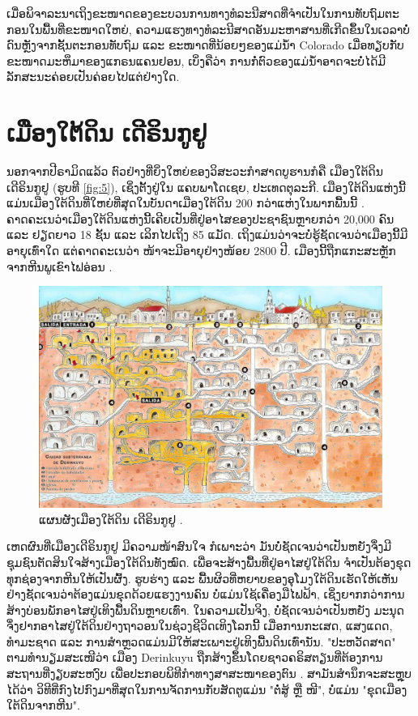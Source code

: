 \documentclass[10pt,twocolumn,letterpaper]{article}
\begin{document}
ເມື່ອພິຈາລະນາເຖິງຂະໜາດຂອງຂະບວນການທາງທໍລະນີສາດທີ່ຈຳເປັນໃນການທັບຖົມຕະກອນໃນພື້ນທີ່ຂະໜາດໃຫຍ່, ຄວາມແຮງທາງທໍລະນີສາດອັນມະຫາສານທີ່ເກີດຂຶ້ນໃນເວລາບໍ່ດົນຫຼັງຈາກຊັ້ນຕະກອນທັບຖົມ ແລະ ຂະໜາດທີ່ນ້ອຍໆຂອງແມ່ນ້ຳ Colorado ເມື່ອທຽບກັບຂະໜາດມະຫຶມາຂອງແກຣນແຄນຢອນ, ເບິ່ງຄືວ່າ ການກໍ່ຕົວຂອງແມ່ນ້ຳອາດຈະບໍ່ໄດ້ມີລັກສະນະຄ່ອຍເປັນຄ່ອຍໄປແຕ່ຢ່າງໃດ. 

\section{ເມືອງໃຕ້ດິນ ເດີຣິນກູຢູ}

ນອກຈາກປີຣາມິດແລ້ວ ຕົວຢ່າງທີ່ຍິ່ງໃຫຍ່ຂອງວິສະວະກຳສາດບູຮານກໍຄື ເມືອງໃຕ້ດິນ ເດີຣິນກູຢູ (ຮູບທີ \ref{fig:5}), ເຊິ່ງຕັ້ງຢູ່ໃນ ແຄບພາໂດເຊຍ, ປະເທດຕຸລະກີ. ເມືອງໃຕ້ດິນແຫ່ງນີ້ແມ່ນເມືອງໃຕ້ດິນທີ່ໃຫຍ່ທີ່ສຸດໃນບັນດາເມືອງໃຕ້ດິນ 200 ກວ່າແຫ່ງໃນພາກພື້ນນີ້ \cite{54}. ຄາດຄະເນວ່າເມືອງໃຕ້ດິນແຫ່ງນີ້ເຄີຍເປັນທີ່ຢູ່ອາໄສຂອງປະຊາຊົນຫຼາຍກວ່າ 20,000 ຄົນ ແລະ ຢຽດຍາວ 18 ຊັ້ນ ແລະ ເລິກໄປເຖິງ 85 ແມັດ. ເຖິງແມ່ນວ່າຈະບໍ່ຮູ້ຊັດເຈນວ່າເມືອງນີ້ມີອາຍຸເທົ່າໃດ ແຕ່ຄາດຄະເນວ່າ ໜ້າຈະມີອາຍຸຢ່າງໜ້ອຍ 2800 ປີ. ເມືອງນີ້ຖືກແກະສະຫຼັກຈາກຫີນພູເຂົາໄຟອ່ອນ \cite{52, 53}.

\begin{figure}[b]
\begin{center}
   \includegraphics[width=1\linewidth]{derinkuyu.jpeg}
\end{center}
   \caption{ແຜນຜັງເມືອງໃຕ້ດິນ ເດີຣິນກູຢູ \cite{56}.}
\label{fig:5}
\label{fig:onecol}
\end{figure}

ເຫດຜົນທີ່ເມືອງເດີຣິນກູຢູ ມີຄວາມໜ້າສົນໃຈ ກໍເພາະວ່າ ມັນບໍ່ຊັດເຈນວ່າເປັນຫຍັງຈຶ່ງມີຊຸມຊົນຕັດສິນໃຈສ້າງເມືອງໃຕ້ດິນທັງໝົດ. ເພື່ອຈະສ້າງພື້ນທີ່ຢູ່ອາໄສຢູ່ໃຕ້ດິນ ຈຳເປັນຕ້ອງຂຸດທຸກຊ່ອງຈາກຫີນໃຫ້ເປັນຜົ້ງ. ຮູບຮ່າງ ແລະ ພື້ນຜິວທີ່ຫຍາບຂອງອຸໂມງໃຕ້ດິນເຮັດໃຫ້ເຫັນຢ່າງຊັດເຈນວ່າຕ້ອງແມ່ນຂຸດດ້ວຍແຮງງານຄົນ ບໍ່ແມ່ນໃຊ້ເຄື່ອງມືໄຟຟ້າ, ເຊິ່ງຍາກກວ່າການສ້າງບ່ອນພັກອາໄສຢູ່ເທິງພື້ນດິນຫຼາຍເທົ່າ. ໃນຄວາມເປັນຈິງ, ບໍ່ຊັດເຈນວ່າເປັນຫຍັງ ມະນຸດຈຶ່ງຢາກອາໄສຢູ່ໃຕ້ດິນຢ່າງຖາວອນໃນຊ່ວງຊີວິດເທິງໂລກນີ້ ເມື່ອການກະເສດ, ແສງແດດ, ທຳມະຊາດ ແລະ ການສຳຫຼວດແມ່ນມີໃຫ້ສະເພາະຢູ່ເທິງພື້ນດິນເທົ່ານັນ. "ປະຫວັດສາດ" ຕາມທຳນຽມສະເໜີວ່າ ເມືອງ Derinkuyu ຖືກສ້າງຂຶ້ນໂດຍຊາວຄຣິສຕຽນທີ່ຕ້ອງການສະຖານທີ່ງຽບສະຫງົບ ເພື່ອປະກອບພິທີກຳທາງສາສະໜາຂອງຕົນ \cite{53}. ສາມັນສຳນຶກຈະສະຫຼຸບໄດ້ວ່າ ວິທີທີ່ກົງໄປກົງມາທີ່ສຸດໃນການຈັດການກັບສັດຕູແມ່ນ "ຕໍ່ສູ້ ຫຼື ໜີ", ບໍ່ແມ່ນ "ຂຸດເມືອງໃຕ້ດິນຈາກຫີນ".
\end{document}
